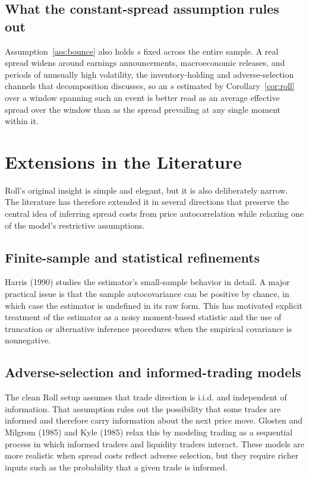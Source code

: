 \documentclass[11pt]{article}
\theoremstyle{remark}
\theoremstyle{definition}
\begin{document}
\subsection{What the constant-spread assumption rules out}
Assumption~\ref{ass:bounce} also holds $s$ fixed across the entire sample. A real spread widens around earnings announcements, macroeconomic releases, and periods of unusually high volatility, the inventory-holding and adverse-selection channels that decomposition discusses, so an $s$ estimated by Corollary~\ref{cor:roll} over a window spanning such an event is better read as an average effective spread over the window than as the spread prevailing at any single moment within it.

\section{Extensions in the Literature}
\label{sec:extensions}

Roll's original insight is simple and elegant, but it is also deliberately narrow. The literature has therefore extended it in several directions that preserve the central idea of inferring spread costs from price autocorrelation while relaxing one of the model's restrictive assumptions.

\subsection{Finite-sample and statistical refinements}
Harris (1990) studies the estimator's small-sample behavior in detail. A major practical issue is that the sample autocovariance can be positive by chance, in which case the estimator is undefined in its raw form. This has motivated explicit treatment of the estimator as a noisy moment-based statistic and the use of truncation or alternative inference procedures when the empirical covariance is nonnegative.

\subsection{Adverse-selection and informed-trading models}
The clean Roll setup assumes that trade direction is i.i.d. and independent of information. That assumption rules out the possibility that some trades are informed and therefore carry information about the next price move. Glosten and Milgrom (1985) and Kyle (1985) relax this by modeling trading as a sequential process in which informed traders and liquidity traders interact. These models are more realistic when spread costs reflect adverse selection, but they require richer inputs such as the probability that a given trade is informed.
\end{document}
